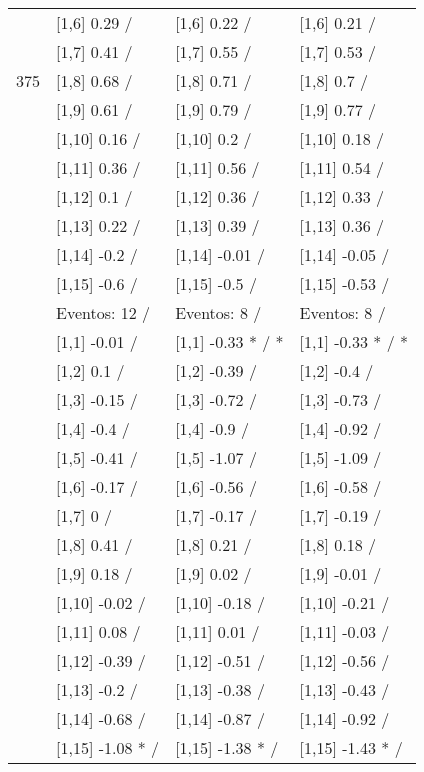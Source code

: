 \begin{table}
\begin{tabular}[t]{llll}
 & {}[1,6] 0.29  / & {}[1,6] 0.22  / & {}[1,6] 0.21  /\\
 & {}[1,7] 0.41  / & {}[1,7] 0.55  / & {}[1,7] 0.53  /\\
375 & {}[1,8] 0.68  / & {}[1,8] 0.71  / & {}[1,8] 0.7  /\\
\addlinespace
 & {}[1,9] 0.61  / & {}[1,9] 0.79  / & {}[1,9] 0.77  /\\
 & {}[1,10] 0.16  / & {}[1,10] 0.2  / & {}[1,10] 0.18  /\\
 & {}[1,11] 0.36  / & {}[1,11] 0.56  / & {}[1,11] 0.54  /\\
 & {}[1,12] 0.1  / & {}[1,12] 0.36  / & {}[1,12] 0.33  /\\
 & {}[1,13] 0.22  / & {}[1,13] 0.39  / & {}[1,13] 0.36  /\\
\addlinespace
 & {}[1,14] -0.2  / & {}[1,14] -0.01  / & {}[1,14] -0.05  /\\
 & {}[1,15] -0.6  / & {}[1,15] -0.5  / & {}[1,15] -0.53  /\\
 & Eventos:  12 / & Eventos:  8 / & Eventos:  8 /\\
 & {}[1,1] -0.01  / & {}[1,1] -0.33 * / * & {}[1,1] -0.33 * / *\\
 & {}[1,2] 0.1  / & {}[1,2] -0.39  / & {}[1,2] -0.4  /\\
\addlinespace
 & {}[1,3] -0.15  / & {}[1,3] -0.72  / & {}[1,3] -0.73  /\\
 & {}[1,4] -0.4  / & {}[1,4] -0.9  / & {}[1,4] -0.92  /\\
 & {}[1,5] -0.41  / & {}[1,5] -1.07  / & {}[1,5] -1.09  /\\
 & {}[1,6] -0.17  / & {}[1,6] -0.56  / & {}[1,6] -0.58  /\\
 & {}[1,7] 0  / & {}[1,7] -0.17  / & {}[1,7] -0.19  /\\
\addlinespace
500 & {}[1,8] 0.41  / & {}[1,8] 0.21  / & {}[1,8] 0.18  /\\
 & {}[1,9] 0.18  / & {}[1,9] 0.02  / & {}[1,9] -0.01  /\\
 & {}[1,10] -0.02  / & {}[1,10] -0.18  / & {}[1,10] -0.21  /\\
 & {}[1,11] 0.08  / & {}[1,11] 0.01  / & {}[1,11] -0.03  /\\
 & {}[1,12] -0.39  / & {}[1,12] -0.51  / & {}[1,12] -0.56  /\\
\addlinespace
 & {}[1,13] -0.2  / & {}[1,13] -0.38  / & {}[1,13] -0.43  /\\
 & {}[1,14] -0.68  / & {}[1,14] -0.87  / & {}[1,14] -0.92  /\\
 & {}[1,15] -1.08 * / & {}[1,15] -1.38 * / & {}[1,15] -1.43 * /\\
\bottomrule
\end{tabular}
\end{table}
